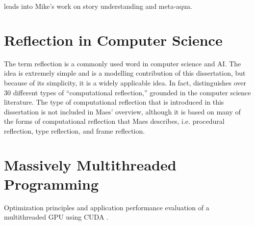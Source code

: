 leads into Mike's work on story understanding and meta-aqua.

\section{Reflection in Computer Science}

The term reflection is a commonly used word in computer science and
AI.  The idea is extremely simple and is a modelling contribution of
this dissertation, but because of its simplicity, it is a widely
applicable idea.  In fact, \cite{maes:1987,maes:1988} distinguishes over 30
different types of ``computational reflection,'' grounded in the
computer science literature.  The type of computational reflection
that is introduced in this dissertation is not included in Maes'
overview, although it is based on many of the forms of computational
reflection that Maes describes, i.e. procedural reflection, type
reflection, and frame reflection.

\section{Massively Multithreaded Programming}

Optimization principles and application performance evaluation of a
multithreaded GPU using CUDA \cite[]{ryoo:2008}.











